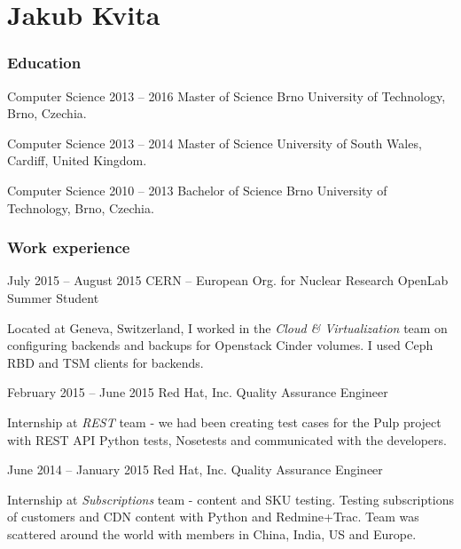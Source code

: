 \documentclass{tccv}
\begin{document}
\part{Jakub Kvita}

\section{Education}

\begin{yearlist}
	
	\item[Computer Science]{2013 -- 2016}
	{Master of Science}
	{Brno University of Technology, Brno, Czechia.}
	
	\item[Computer Science]{2013 -- 2014}
	{Master of Science}
	{University of South Wales, Cardiff, United Kingdom.}
	
	\item[Computer Science]{2010 -- 2013}
	{Bachelor of Science}
	{Brno University of Technology, Brno, Czechia.}
	
\end{yearlist}

\section{Work experience}

\begin{eventlist}

\item{July 2015 -- August 2015}
     {CERN -- European Org. for Nuclear Research}
     {OpenLab Summer Student}

Located at Geneva, Switzerland, I worked in the \emph{Cloud \& Virtualization} team on configuring backends and backups for Openstack Cinder volumes. I used Ceph RBD and TSM clients for backends.

\item{February 2015 -- June 2015}
     {Red Hat, Inc.}
     {Quality Assurance Engineer}

Internship at \emph{REST} team -  we had been creating test cases for the Pulp project with REST API Python tests, Nosetests and communicated with the developers.

\item{June 2014 -- January 2015}
     {Red Hat, Inc.}
     {Quality Assurance Engineer}

Internship at \emph{Subscriptions} team - content and SKU testing. Testing subscriptions of customers and CDN content with Python and Redmine+Trac. Team was scattered around the world with members in China, India, US and Europe.

\end{eventlist}
\end{document}
